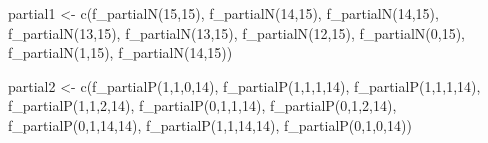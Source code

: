 \documentclass[
  letterpaper,
  DIV=11,
  numbers=noendperiod]{scrreprt}
\newenvironment{Shaded}{\begin{snugshade}}{\end{snugshade}}
\newcommand{\DecValTok}[1]{\textcolor[rgb]{0.68,0.00,0.00}{#1}}
\newcommand{\FunctionTok}[1]{\textcolor[rgb]{0.28,0.35,0.67}{#1}}
\newcommand{\NormalTok}[1]{\textcolor[rgb]{0.00,0.23,0.31}{#1}}
\newcommand{\OtherTok}[1]{\textcolor[rgb]{0.00,0.23,0.31}{#1}}
\begin{document}
\begin{Shaded}
\begin{Highlighting}[]
\NormalTok{partial1 }\OtherTok{\textless{}{-}} \FunctionTok{c}\NormalTok{(}\FunctionTok{f\_partialN}\NormalTok{(}\DecValTok{15}\NormalTok{,}\DecValTok{15}\NormalTok{), }
              \FunctionTok{f\_partialN}\NormalTok{(}\DecValTok{14}\NormalTok{,}\DecValTok{15}\NormalTok{), }
              \FunctionTok{f\_partialN}\NormalTok{(}\DecValTok{14}\NormalTok{,}\DecValTok{15}\NormalTok{), }
              \FunctionTok{f\_partialN}\NormalTok{(}\DecValTok{13}\NormalTok{,}\DecValTok{15}\NormalTok{), }
              \FunctionTok{f\_partialN}\NormalTok{(}\DecValTok{13}\NormalTok{,}\DecValTok{15}\NormalTok{),}
              \FunctionTok{f\_partialN}\NormalTok{(}\DecValTok{12}\NormalTok{,}\DecValTok{15}\NormalTok{),}
              \FunctionTok{f\_partialN}\NormalTok{(}\DecValTok{0}\NormalTok{,}\DecValTok{15}\NormalTok{),}
              \FunctionTok{f\_partialN}\NormalTok{(}\DecValTok{1}\NormalTok{,}\DecValTok{15}\NormalTok{),}
              \FunctionTok{f\_partialN}\NormalTok{(}\DecValTok{14}\NormalTok{,}\DecValTok{15}\NormalTok{))}

\NormalTok{partial2 }\OtherTok{\textless{}{-}} \FunctionTok{c}\NormalTok{(}\FunctionTok{f\_partialP}\NormalTok{(}\DecValTok{1}\NormalTok{,}\DecValTok{1}\NormalTok{,}\DecValTok{0}\NormalTok{,}\DecValTok{14}\NormalTok{), }
              \FunctionTok{f\_partialP}\NormalTok{(}\DecValTok{1}\NormalTok{,}\DecValTok{1}\NormalTok{,}\DecValTok{1}\NormalTok{,}\DecValTok{14}\NormalTok{), }
              \FunctionTok{f\_partialP}\NormalTok{(}\DecValTok{1}\NormalTok{,}\DecValTok{1}\NormalTok{,}\DecValTok{1}\NormalTok{,}\DecValTok{14}\NormalTok{), }
              \FunctionTok{f\_partialP}\NormalTok{(}\DecValTok{1}\NormalTok{,}\DecValTok{1}\NormalTok{,}\DecValTok{2}\NormalTok{,}\DecValTok{14}\NormalTok{), }
              \FunctionTok{f\_partialP}\NormalTok{(}\DecValTok{0}\NormalTok{,}\DecValTok{1}\NormalTok{,}\DecValTok{1}\NormalTok{,}\DecValTok{14}\NormalTok{),}
              \FunctionTok{f\_partialP}\NormalTok{(}\DecValTok{0}\NormalTok{,}\DecValTok{1}\NormalTok{,}\DecValTok{2}\NormalTok{,}\DecValTok{14}\NormalTok{),}
              \FunctionTok{f\_partialP}\NormalTok{(}\DecValTok{0}\NormalTok{,}\DecValTok{1}\NormalTok{,}\DecValTok{14}\NormalTok{,}\DecValTok{14}\NormalTok{),}
              \FunctionTok{f\_partialP}\NormalTok{(}\DecValTok{1}\NormalTok{,}\DecValTok{1}\NormalTok{,}\DecValTok{14}\NormalTok{,}\DecValTok{14}\NormalTok{), }
              \FunctionTok{f\_partialP}\NormalTok{(}\DecValTok{0}\NormalTok{,}\DecValTok{1}\NormalTok{,}\DecValTok{0}\NormalTok{,}\DecValTok{14}\NormalTok{))}


\end{Highlighting}
\end{Shaded}
\end{document}
